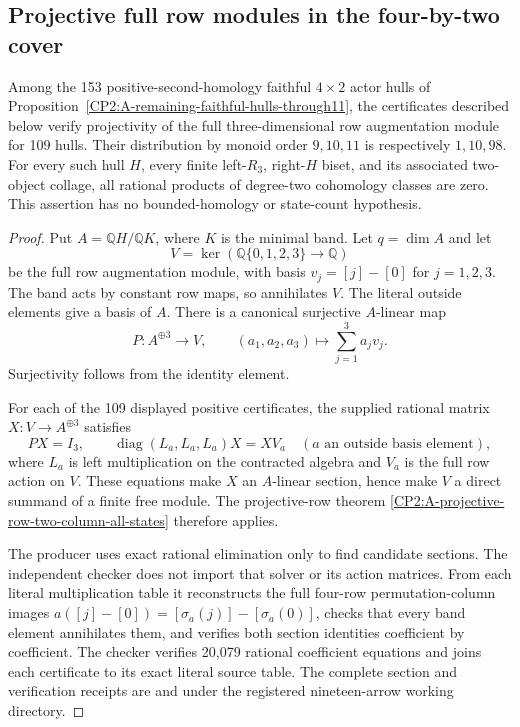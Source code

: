 \subsection{Projective full row modules in the four-by-two cover}

\begin{proposition}
\label{CP2:A-remaining-four-row-projective-hulls}
Among the 153 positive-second-homology faithful $4\times2$ actor hulls
of Proposition~\ref{CP2:A-remaining-faithful-hulls-through11}, the
certificates described below verify projectivity of the full
three-dimensional row augmentation module for 109 hulls.  Their
distribution by monoid order $9,10,11$ is respectively $1,10,98$.
For every such hull $H$, every finite left-$R_3$, right-$H$ biset,
and its associated two-object collage, all rational products of
degree-two cohomology classes are zero.  This assertion has no
bounded-homology or state-count hypothesis.
\end{proposition}
\begin{proof}
Put $A=\mathbb QH/\mathbb QK$, where $K$ is the minimal band.
Let $q=\dim A$ and let
\[
 V=\ker(\mathbb Q\{0,1,2,3\}\longrightarrow\mathbb Q)
\]
be the full row augmentation module, with basis
$v_j=[j]-[0]$ for $j=1,2,3$.  The band acts by constant row maps,
so annihilates $V$.  The literal outside elements give a basis of
$A$.  There is a canonical surjective $A$-linear map
\[
 P:A^{\oplus3}\longrightarrow V,\qquad
 (a_1,a_2,a_3)\longmapsto\sum_{j=1}^{3}a_jv_j.
\]
Surjectivity follows from the identity element.

For each of the 109 displayed positive certificates, the supplied
rational matrix $X:V\to A^{\oplus3}$ satisfies
\[
 PX=I_3,\qquad
 \operatorname{diag}(L_a,L_a,L_a)X=XV_a
 \quad(a\text{ an outside basis element}),
\]
where $L_a$ is left multiplication on the contracted algebra and
$V_a$ is the full row action on $V$.  These equations make $X$
an $A$-linear section, hence make $V$ a direct summand of a finite
free module.  The projective-row theorem
\ref{CP2:A-projective-row-two-column-all-states} therefore applies.

The producer 
uses exact rational elimination only to find candidate sections.
The independent checker
does not import that solver or its action matrices.  From each
literal multiplication table it reconstructs the full four-row
permutation-column images
$a([j]-[0])=[\sigma_a(j)]-[\sigma_a(0)]$, checks that every
band element annihilates them, and verifies both section identities
coefficient by coefficient.  The checker verifies 20,079 rational
coefficient equations and joins each certificate to its exact
literal source table.  The complete section and verification
receipts are
and
under the registered nineteen-arrow working directory.
\end{proof}

